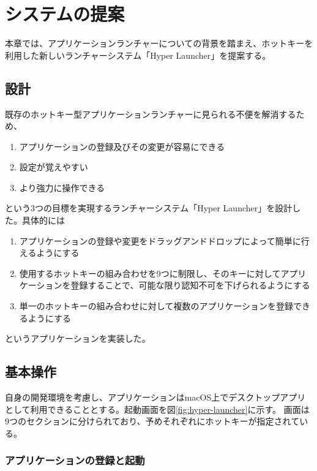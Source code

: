 \chapter{システムの提案}
\label{chap:system}

\newpage

本章では、アプリケーションランチャーについての背景を踏まえ、ホットキーを利用した新しいランチャーシステム「Hyper Launcher」を提案する。

\section{設計}

既存のホットキー型アプリケーションランチャーに見られる不便を解消するため、

\begin{enumerate}
	\item アプリケーションの登録及びその変更が容易にできる
	\item 設定が覚えやすい
	\item より強力に操作できる
\end{enumerate}

という3つの目標を実現するランチャーシステム「Hyper Launcher」を設計した。具体的には

\begin{enumerate}
	\item アプリケーションの登録や変更をドラッグアンドドロップによって簡単に行えるようにする
	\item 使用するホットキーの組み合わせを9つに制限し、そのキーに対してアプリケーションを登録することで、可能な限り認知不可を下げられるようにする
	\item 単一のホットキーの組み合わせに対して複数のアプリケーションを登録できるようにする
\end{enumerate}

というアプリケーションを実装した。

\section{基本操作}

自身の開発環境を考慮し、アプリケーションはmacOS上でデスクトップアプリとして利用できることとする。起動画面を図\ref{fig:hyper-launcher}に示す。
画面は9つのセクションに分けられており、予めそれぞれにホットキーが指定されている。

\subsection{アプリケーションの登録と起動}

